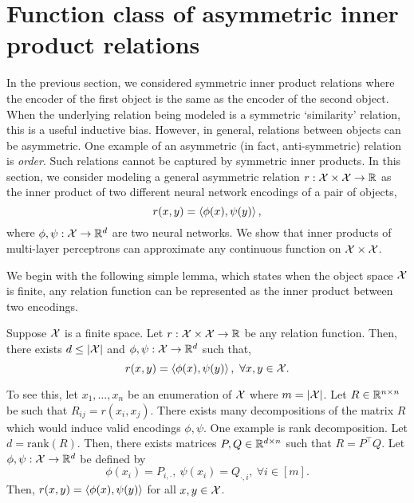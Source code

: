 \section{Function class of asymmetric inner product relations}\label{sec:asymmetric_relations}

In the previous section, we considered symmetric inner product relations where the encoder of the first object is the same as the encoder of the second object. When the underlying relation being modeled is a symmetric `similarity' relation, this is a useful inductive bias. However, in general, relations between objects can be asymmetric. One example of an asymmetric (in fact, anti-symmetric) relation is \textit{order}. Such relations cannot be captured by symmetric inner products. In this section, we consider modeling a general asymmetric relation $r: {\mathcal{X}} \times {\mathcal{X}} \to \mathbb{R}$ as the inner product of two different neural network encodings of a pair of objects,
\begin{equation}\label{eq:asymmetric_iprod_relation}
    r(x, y) = \iprod{\phi(x)}{\psi(y)},
\end{equation}
where $\phi, \psi: {\mathcal{X}} \to \mathbb{R}^d$ are two neural networks.
We show that inner products of multi-layer perceptrons can approximate any continuous function on ${\mathcal{X}} \times {\mathcal{X}}$.

We begin with the following simple lemma, which states when the object space ${\mathcal{X}}$ is finite, any relation function can be represented as the inner product between two encodings.

\begin{lemma}\label{lemma:finite_space_rel}
    Suppose ${\mathcal{X}}$ is a finite space. Let $r: {\mathcal{X}} \times {\mathcal{X}} \to \mathbb{R}$ be any relation function. Then, there exists $d \leq \left\lvert{\mathcal{X}}\right\rvert$ and $\phi, \psi: {\mathcal{X}} \to \mathbb{R}^{d}$ such that,
    \begin{equation*}
        r(x, y) = \left \langle \phi(x), \psi(y) \right\rangle, \ \forall x, y \in {\mathcal{X}}.
    \end{equation*}
\end{lemma}

To see this, let $x_1, \ldots, x_n$ be an enumeration of ${\mathcal{X}}$ where $m = \left\lvert{\mathcal{X}}\right\rvert$. Let $R \in \mathbb{R}^{n \times n}$ be such that $R_{ij} = r(x_i, x_j)$. There exists many decompositions of the matrix $R$ which would induce valid encodings $\phi, \psi$. One example is rank decomposition. Let $d = \mathrm{rank}(R)$. Then, there exists matrices $P, Q \in \mathbb{R}^{d \times n}$ such that $R = P^\top Q$. Let $\phi, \psi: {\mathcal{X}} \to \mathbb{R}^{d}$ be defined by
    \begin{equation}
        \phi(x_i) = P_{i, \cdot}, \ \psi(x_i) = Q_{\cdot, i}, \ \forall i \in [m].
    \end{equation}
Then, $r(x, y) = \left \langle \phi(x), \psi(y) \right\rangle$ for all $x, y \in {\mathcal{X}}$.


